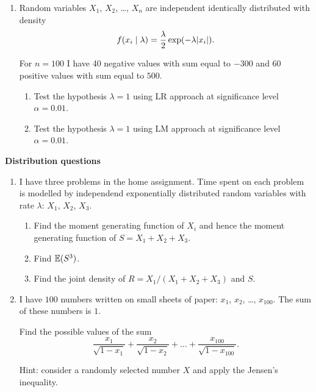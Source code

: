 \begin{enumerate}
    \item Random variables $X_1$, $X_2$, \ldots,  $X_n$ are independent identically distributed with density 
    \[
    f(x_i \mid \lambda) = \frac{\lambda}{2} \exp(-\lambda \abs{x_i}).    
    \]

    For $n=100$ I have 40 negative values with sum equal to $-300$ and 60 positive values with sum equal to $500$. 

    \begin{enumerate}
        \item Test the hypothesis $\lambda = 1$ using LR approach at significance level $\alpha=0.01$.
        \item Test the hypothesis $\lambda = 1$ using LM approach at significance level $\alpha=0.01$.
    \end{enumerate}


\end{enumerate}

\newpage
    \textbf{Distribution questions}

    \begin{enumerate}[resume]
    \item I have three problems in the home assignment. 
    Time spent on each problem is modelled by independend exponentially distributed random variables with rate $\lambda$: $X_1$, $X_2$, $X_3$.

    \begin{enumerate}
        \item Find the moment generating function of $X_i$ and hence the moment generating function of $S = X_1 + X_2 + X_3$.
        \item Find $\operatorname{\mathbb{E}}(S^3)$.
        \item Find the joint density of $R = X_1 / (X_1 + X_2 + X_3)$ and $S$.
    \end{enumerate}

    \item I have $100$ numbers written on small sheets of paper: $x_1$, $x_2$, \ldots, $x_{100}$. The sum of these numbers is $1$. 
    
    Find the possible values of the sum 
    \[
    \frac{x_1}{\sqrt{1-x_1}} +     \frac{x_2}{\sqrt{1-x_2}} + \ldots + \frac{x_{100}}{\sqrt{1-x_{100}}}.
    \]
    

    Hint: consider a randomly selected number $X$ and apply the Jensen's inequality.
    
 
\end{enumerate}
